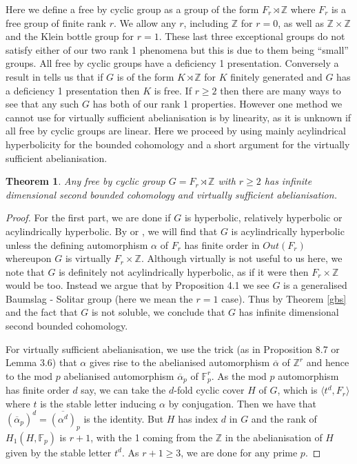 \documentclass[11pt,reqno]{amsart}
\numberwithin{equation}{section}
\newcommand{\Z}{\mathbb{Z}}
\newcommand{\F}{\mathbb{F}}
\newtheorem{thm}{Theorem}[section]
\theoremstyle{definition}
\theoremstyle{remark}
\begin{document}
Here we define a free by cyclic group as a group of the form
$F_r\rtimes\Z$ where $F_r$ is a free group of finite rank $r$. We
allow any $r$, including $\Z$ for $r=0$, as well as
$\Z\times\Z$ and the Klein bottle
group for $r=1$. These last three exceptional groups do not satisfy either of
our two rank 1 phenomena but this is due to them being ``small'' groups.
All free by cyclic groups have a deficiency 1 presentation. Conversely
a result in \cite{dss} tells us that if $G$ is of the form
$K\rtimes\Z$ for $K$ finitely generated and $G$ has a deficiency 1
presentation then $K$ is free. If $r\geq 2$ then there are many ways to
see that any such $G$ has both of our rank 1 properties. However
one method we
cannot use for virtually sufficient abelianisation is by linearity, as
it is unknown if all free by cyclic groups are linear. Here we proceed
by using mainly acylindrical hyperbolicity for the bounded cohomology
and a short argument for the virtually sufficient abelianisation.

\begin{thm} \label{fbyz}
  Any free by cyclic group $G=F_r\rtimes \Z$ with $r\geq 2$
  has infinite dimensional second bounded cohomology and virtually
  sufficient abelianisation.
\end{thm}  
\begin{proof} For the first part, we are done if $G$ is hyperbolic,
  relatively hyperbolic or acylindrically hyperbolic. By \cite{ghst}
  or \cite{dm?}, we will find that $G$ is acylindrically hyperbolic
  unless the defining automorphism $\alpha$ of $F_r$ has finite order
  in $Out(F_r)$ whereupon $G$ is virtually $F_r\times \Z$. Although virtually
  is not useful to us here, we note that $G$ is definitely not acylindrically
  hyperbolic, as if it were then $F_r\times\Z$ would be too.
Instead we argue that by \cite{lvrf} Proposition 4.1 we see $G$ is
a generalised Baumslag - Solitar group (here we mean the $r=1$ case).
Thus by Theorem \ref{gbs} and the fact that $G$ is not soluble, we
conclude that $G$ has infinite dimensional second bounded cohomology.

For virtually sufficient abelianisation, we use the trick
(as in \cite{lac} Proposition 8.7 or \cite{mearx} Lemma 3.6)
that $\alpha$ gives rise to the abelianised automorphism
$\overline{\alpha}$ of $\Z^r$ and hence to the mod $p$ abelianised
automorphism $\overline{\alpha}_p$ of $\F_p^r$. As the mod $p$ automorphism
has finite order $d$ say, we can take the $d$-fold cyclic cover $H$ of $G$,
which is $\langle t^d,F_r\rangle$ where $t$ is the stable letter
inducing $\alpha$ by conjugation. Then we have that
$(\overline{\alpha}_p)^d=\overline{(\alpha^d)}_p$ is the identity. But $H$
has index $d$ in $G$ and the rank of $H_1(H,\F_p)$ is $r+1$, with the 1
coming from the $\Z$ in the abelianisation of $H$ given by the stable
letter $t^d$. As $r+1\geq 3$, we are done for any prime $p$.
\end{proof}
\end{document}
